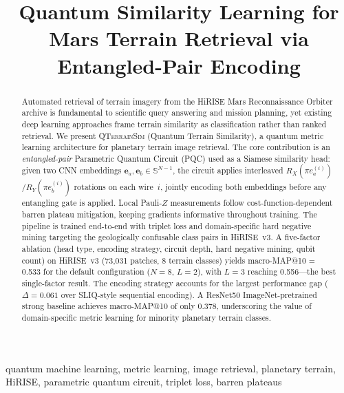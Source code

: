\documentclass[conference,a4paper]{IEEEtran}
\newcommand{\qts}{\textsc{QTerrainSim}}
\newcommand{\RX}{R_X}
\newcommand{\RY}{R_Y}
\newcommand{\PauliZ}{Z}
\begin{document}
\title{Quantum Similarity Learning for Mars Terrain Retrieval via Entangled-Pair Encoding}



\author{}

\maketitle

\begin{abstract}
Automated retrieval of terrain imagery from the HiRISE Mars Reconnaissance
Orbiter archive is fundamental to scientific query answering and mission
planning, yet existing deep learning approaches frame terrain similarity as
classification rather than ranked retrieval.
We present \qts{} (Quantum Terrain Similarity), a quantum metric
learning architecture for planetary terrain image retrieval.
The core contribution is an \emph{entangled-pair} Parametric Quantum Circuit
(PQC) used as a Siamese similarity head: given two CNN embeddings
$\mathbf{e}_a, \mathbf{e}_b \in \mathbb{S}^{N-1}$, the circuit applies
interleaved $\RX(\pi e_a^{(i)})$/$\RY(\pi e_b^{(i)})$ rotations on each
wire~$i$, jointly encoding both embeddings before any entangling gate is
applied.
Local Pauli-$\PauliZ$ measurements follow cost-function-dependent barren
plateau mitigation, keeping gradients informative throughout training.
The pipeline is trained end-to-end with triplet loss and domain-specific
hard negative mining targeting the geologically confusable class pairs in
HiRISE~v3.
A five-factor ablation (head type, encoding strategy, circuit depth, hard
negative mining, qubit count) on HiRISE~v3 (73,031 patches, 8 terrain
classes) yields macro-MAP@10 = 0.533 for the default configuration
($N{=}8$, $L{=}2$), with $L{=}3$ reaching 0.556---the best single-factor result.
The encoding strategy accounts for the largest performance gap
($\Delta{=}0.061$ over SLIQ-style sequential encoding).
A ResNet50 ImageNet-pretrained strong baseline achieves macro-MAP@10 of
only 0.378, underscoring the value of domain-specific metric learning for
minority planetary terrain classes.
\end{abstract}

\begin{IEEEkeywords}
quantum machine learning, metric learning, image retrieval,
planetary terrain, HiRISE, parametric quantum circuit, triplet loss,
barren plateaus
\end{IEEEkeywords}
\end{document}
